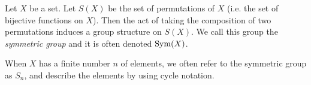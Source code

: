 \documentclass[12pt]{article}
\begin{document}
Let $X$ be a set.
Let $S(X)$ be the set of permutations of $X$
(i.e. the set of bijective functions on $X$).
Then the act of taking the composition of two permutations
induces a group structure on $S(X)$.
We call this group the {\it symmetric group}
and it is often denoted ${\rm Sym}(X)$.

When $X$ has a finite number $n$ of elements,
we often refer to the symmetric group as $S_n$,
and describe the elements by using cycle notation.
\end{document}
